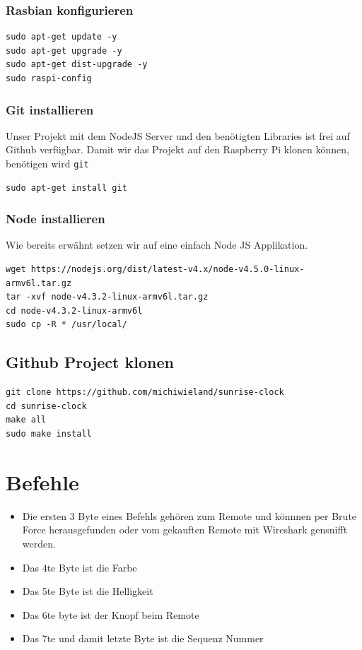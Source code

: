 \subsubsection{Rasbian konfigurieren}
\begin{lstlisting}
sudo apt-get update -y
sudo apt-get upgrade -y
sudo apt-get dist-upgrade -y
sudo raspi-config
\end{lstlisting}

\subsubsection{Git installieren}
Unser Projekt mit dem NodeJS Server und den benötigten Libraries ist frei auf Github verfügbar. Damit wir das Projekt auf den Raspberry Pi klonen können, benötigen wird \lstinline|git|
\begin{lstlisting}[caption=Git installieren]
sudo apt-get install git
\end{lstlisting}

\subsubsection{Node installieren}
Wie bereits erwähnt setzen wir auf eine einfach Node JS Applikation. 
\begin{lstlisting}[caption=Node installieren]
wget https://nodejs.org/dist/latest-v4.x/node-v4.5.0-linux-armv6l.tar.gz   
tar -xvf node-v4.3.2-linux-armv6l.tar.gz 
cd node-v4.3.2-linux-armv6l
sudo cp -R * /usr/local/
\end{lstlisting}

\subsection{Github Project klonen}
\begin{lstlisting}[caption=Github klonen]
git clone https://github.com/michiwieland/sunrise-clock
cd sunrise-clock
make all
sudo make install	
\end{lstlisting}

\section{Befehle}
\begin{itemize}
	\item Die ersten 3 Byte eines Befehls gehören zum Remote und könnnen per Brute Force herausgefunden oder vom gekauften Remote mit Wireshark gensnifft werden.
	\item Das 4te Byte ist die Farbe
	\item Das 5te Byte ist die Helligkeit
	\item Das 6te byte ist der Knopf beim Remote
	\item Das 7te und damit letzte Byte ist die Sequenz Nummer
\end{itemize}

